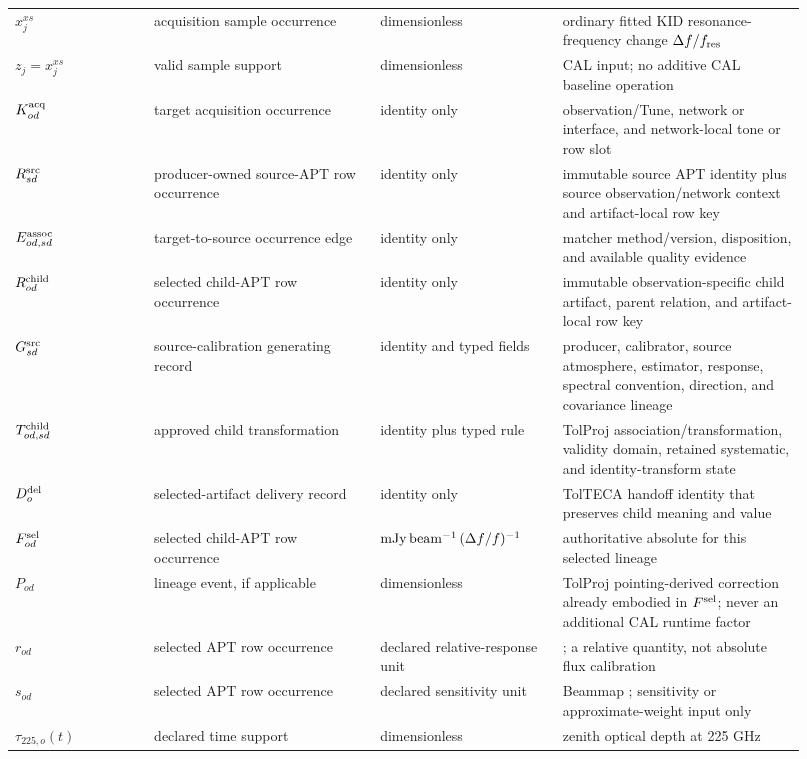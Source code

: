\begin{longtable}{L{0.16\linewidth}L{0.26\linewidth}L{0.21\linewidth}L{0.29\linewidth}}
\(x^{xs}_{j}\) & acquisition sample occurrence & dimensionless & ordinary fitted KID resonance-frequency change \(\Delta f/f_{\rm res}\) \\
\(z_j=x^{xs}_j\) & valid sample support & dimensionless & CAL input; no additive CAL baseline operation \\
\(K^{\rm acq}_{od}\) & target acquisition occurrence & identity only & observation/Tune, network or interface, and network-local tone or row slot \\
\(R^{\rm src}_{sd}\) & producer-owned source-APT row occurrence & identity only & immutable source APT identity plus source observation/network context and artifact-local row key \\
\(E^{\rm assoc}_{od,sd}\) & target-to-source occurrence edge & identity only & matcher method/version, disposition, and available quality evidence \\
\(R^{\rm child}_{od}\) & selected child-APT row occurrence & identity only & immutable observation-specific child artifact, parent relation, and artifact-local row key \\
\(G^{\rm src}_{sd}\) & source-calibration generating record & identity and typed fields & producer, calibrator, source atmosphere, estimator, response, spectral convention, direction, and covariance lineage \\
\(T^{\rm child}_{od,sd}\) & approved child transformation & identity plus typed rule & TolProj association/transformation, validity domain, retained systematic, and identity-transform state \\
\(D^{\rm del}_{o}\) & selected-artifact delivery record & identity only & TolTECA handoff identity that preserves child meaning and value \\
\(F^{\rm sel}_{od}\) & selected child-APT row occurrence & \(\mathrm{mJy\,beam^{-1}}\,(\Delta f/f)^{-1}\) & authoritative absolute  for this selected lineage \\
\(P_{od}\) & lineage event, if applicable & dimensionless & TolProj pointing-derived correction already embodied in \(F^{\rm sel}\); never an additional CAL runtime factor \\
\(r_{od}\) & selected APT row occurrence & declared relative-response unit & ; a relative quantity, not absolute flux calibration \\
\(s_{od}\) & selected APT row occurrence & declared sensitivity unit & Beammap ; sensitivity or approximate-weight input only \\
\(\tau_{225,o}(t)\) & declared time support & dimensionless & zenith optical depth at 225 GHz \\

\end{longtable}
